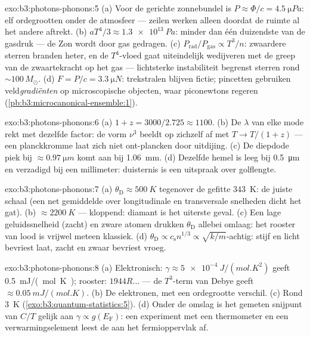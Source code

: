 \begin{solution}{exo:b3:photons-phonons:5}
(a) Voor de gerichte zonnebundel is $P \approx \Phi/c =
\qty{4.5}{\micro Pa}$: elf ordegrootten onder de atmosfeer ---
zeilen werken alleen doordat de ruimte al het andere aftrekt. (b)
$aT^4/3 \approx \qty{1.3e13}{Pa}$: minder dan één duizendste
van de gasdruk --- de Zon wordt door gas gedragen. (c)
$P_{\text{rad}}/P_{\text{gas}} \propto T^3/n$: zwaardere sterren
branden heter, en de $T^4$-vloed gaat uiteindelijk wedijveren met
de greep van de zwaartekracht op het gas --- lichtsterke
instabiliteit begrenst sterren rond
$\sim100\,M_\odot$. (d) $F = P/c = \qty{3.3}{\micro N}$:
trekstralen blijven fictie; pincetten gebruiken veld\emph{gradiënten}
op microscopische objecten, waar piconewtons regeren
(\cref{pb:b3:microcanonical-ensemble:1}).
\end{solution}

\begin{solution}{exo:b3:photons-phonons:6}
(a) $1 + z = 3000/2.725 \approx 1100$. (b) De $\lambda$ van elke mode
rekt met dezelfde factor: de vorm $\nu^3$ beeldt op zichzelf af
met $T \to T/(1+z)$ --- een planckkromme laat zich niet
ont-plancken door uitdijing. (c) De diepdode piek bij
$\approx\qty{0.97}{\micro m}$ komt aan bij \qty{1.06}{mm}. (d) Dezelfde
hemel is leeg bij \qty{0.5}{\micro m} en verzadigd bij een
millimeter: duisternis is een uitspraak over golflengte.
\end{solution}

\begin{solution}{exo:b3:photons-phonons:7}
(a) $\theta_{\text{D}} \approx \qty{500}{K}$ tegenover de gefitte
\qty{343}{K}: de juiste schaal (een net gemiddelde over
longitudinale en transversale snelheden dicht het gat). (b)
$\approx\qty{2200}{K}$ --- kloppend: diamant is het uiterste
geval. (c) Een lage geluidssnelheid (zacht) en zware atomen
drukken $\theta_{\text{D}}$ allebei omlaag: het rooster van lood
is vrijwel meteen klassiek. (d) $\theta_{\text{D}} \propto
c_{\text{s}}n^{1/3} \propto \sqrt{k/m}$-achtig: stijf en licht
bevriest laat, zacht en zwaar bevriest vroeg.
\end{solution}

\begin{solution}{exo:b3:photons-phonons:8}
(a) Elektronisch: $\gamma \approx \qty{5e-4}{J/(mol.K^2)}$ geeft
\qty{0.5}{mJ/(mol.K)}; rooster: $1944R\dots$ --- de $T^3$-term van
Debye geeft $\approx\qty{0.05}{mJ/(mol.K)}$. (b) De elektronen, met
een ordegrootte verschil. (c) Rond \qty{3}{K}
(\cref{exo:b3:quantum-statistics:5}). (d) Onder de omslag is het
gemeten snijpunt van $C/T$ gelijk aan $\gamma \propto g(E_{\text{F}})$:
een experiment met een thermometer en een verwarmingselement leest
de  aan het fermioppervlak af.
\end{solution}

